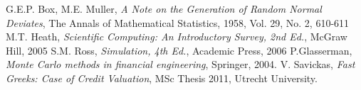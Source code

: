 \documentclass[11pt,a4paper]{article}
\begin{document}
\begin{thebibliography}{10}
  G.E.P. Box, M.E. Muller, \emph{A Note on the Generation of Random Normal Deviates}, The Annals of Mathematical Statistics, 1958, Vol. 29, No. 2, 610-611
  M.T. Heath, \emph{Scientific Computing: An Introductory Survey, 2nd Ed.}, McGraw Hill, 2005
  S.M. Ross, \emph{Simulation, 4th Ed.}, Academic Press, 2006
  P.Glasserman, \emph{Monte Carlo methods in financial engineering}, Springer, 2004. 
  V. Savickas, \emph{Fast Greeks: Case of Credit Valuation}, MSc Thesis 2011, Utrecht University.
\end{thebibliography}
\end{document}
